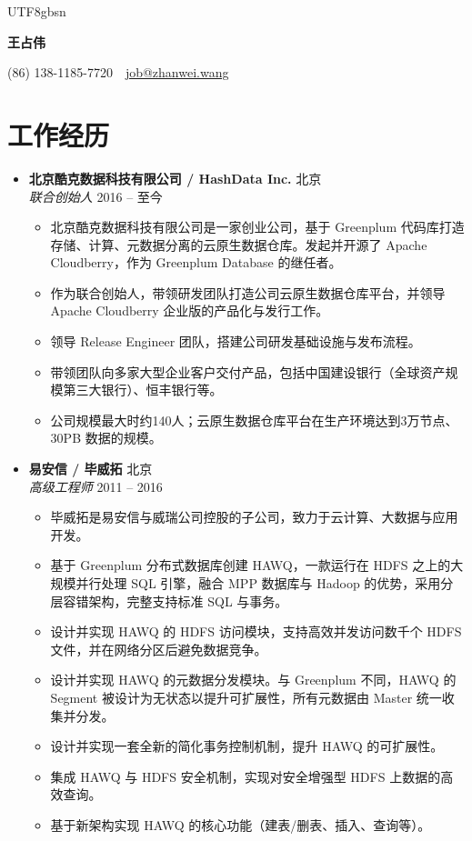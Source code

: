\documentclass[10pt,a4paper]{article}
\newcommand{\entry}[4]{%
	\textbf{#1} \hfill {\color{subtle}#2}\\
	{\textit{#3}} \hfill {\color{subtle}\small #4}
}
\begin{document}
\begin{CJK}{UTF8}{gbsn}

\begin{center}
	{\fontsize{22}{24}\selectfont\bfseries\color{accent} 王占伟}

	\vspace{0.35em}
	{\small\color{subtle}
		(86) 138-1185-7720
		\,\textbar\,
		\href{mailto:job@zhanwei.wang}{job@zhanwei.wang}
	}
\end{center}
\vspace{-0.6em}

\section*{工作经历}

\begin{itemize}

	\item
	\entry{北京酷克数据科技有限公司 / HashData Inc.}{北京}
		{联合创始人}{2016 -- 至今}
	\begin{itemize}
		\item 北京酷克数据科技有限公司是一家创业公司，基于 Greenplum 代码库打造存储、计算、元数据分离的云原生数据仓库。发起并开源了 Apache Cloudberry，作为 Greenplum Database 的继任者。
		\item 作为联合创始人，带领研发团队打造公司云原生数据仓库平台，并领导 Apache Cloudberry 企业版的产品化与发行工作。
		\item 领导 Release Engineer 团队，搭建公司研发基础设施与发布流程。
		\item 带领团队向多家大型企业客户交付产品，包括中国建设银行（全球资产规模第三大银行）、恒丰银行等。
		\item 公司规模最大时约140人；云原生数据仓库平台在生产环境达到3万节点、30PB 数据的规模。
	\end{itemize}

	\item
	\entry{易安信 / 毕威拓}{北京}
		{高级工程师}{2011 -- 2016}
	\begin{itemize}
		\item 毕威拓是易安信与威瑞公司控股的子公司，致力于云计算、大数据与应用开发。
		\item 基于 Greenplum 分布式数据库创建 HAWQ，一款运行在 HDFS 之上的大规模并行处理 SQL 引擎，融合 MPP 数据库与 Hadoop 的优势，采用分层容错架构，完整支持标准 SQL 与事务。
		\item 设计并实现 HAWQ 的 HDFS 访问模块，支持高效并发访问数千个 HDFS 文件，并在网络分区后避免数据竞争。
		\item 设计并实现 HAWQ 的元数据分发模块。与 Greenplum 不同，HAWQ 的 Segment 被设计为无状态以提升可扩展性，所有元数据由 Master 统一收集并分发。
		\item 设计并实现一套全新的简化事务控制机制，提升 HAWQ 的可扩展性。
		\item 集成 HAWQ 与 HDFS 安全机制，实现对安全增强型 HDFS 上数据的高效查询。
		\item 基于新架构实现 HAWQ 的核心功能（建表/删表、插入、查询等）。
	\end{itemize}


\end{itemize}
\end{CJK}
\end{document}
